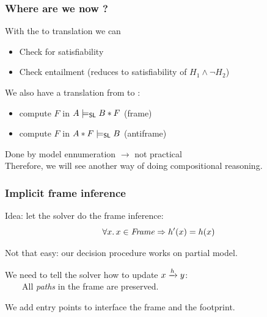 \documentclass{beamer}
\begin{document}
\begin{frame}
  \frametitle{Where are we now ?}
  With the \JoshLogic to \LRJQ translation we can
  \begin{itemize}
  \item Check for satisfiability
  \item Check entailment (reduces to satisfiability of $H_1 \land \neg H_2$)
  \end{itemize}

  \vspace{3ex}

  We also have a translation from \LRJQ to \JoshLogic:
  \begin{itemize}
  \item compute $F$ in $A \models_{\mathsf{SL}} B*F$ (frame)
  \item compute $F$ in $A*F \models_{\mathsf{SL}} B$ (antiframe)
  \end{itemize}
  Done by model ennumeration $\rightarrow$ not practical\\
  Therefore, we will see another way of doing compositional reasoning.
  
\end{frame}

\begin{frame}
  \frametitle{Implicit frame inference}

  Idea: let the solver do the frame inference:
\[
    \forall x. \, x \in \mathit{Frame} \Rightarrow h'(x) = h(x)
\]

\vspace{2ex}

  Not that easy: our decision procedure works on partial model.

\vspace{1ex}

  We need to tell the solver how to update $x \xrightarrow{h} y$:\\
  \mbox{}\ \ \ \ All \emph{paths} in the frame are preserved.

  We add \alert{entry points} to interface the frame and the footprint.

\end{frame}
\end{document}
